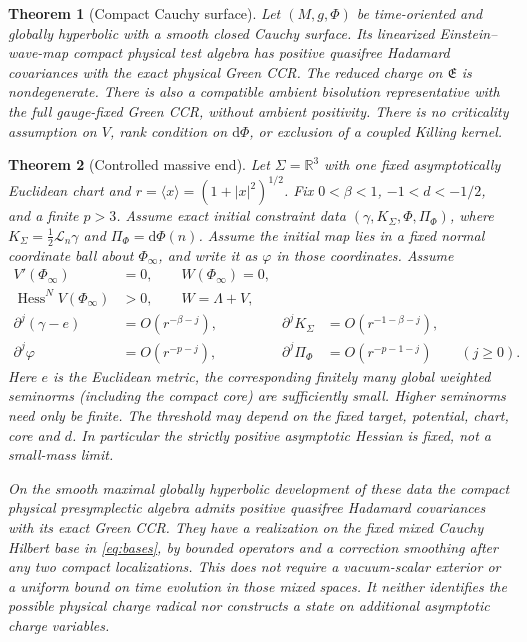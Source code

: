 \documentclass[11pt]{article}
\newtheorem{theorem}{Theorem}
\newcommand{\dd}{\mathrm d}
\newcommand{\Lie}{\mathcal L}
\begin{document}
\begin{theorem}[Compact Cauchy surface]\label{thm:compact}
Let \((M,g,\Phi)\) be time-oriented and globally hyperbolic with a smooth closed Cauchy surface. Its linearized Einstein--wave-map compact physical test algebra has positive quasifree Hadamard covariances with the exact physical Green CCR. The reduced charge on \(\mathfrak E\) is nondegenerate. There is also a compatible ambient bisolution representative with the full gauge-fixed Green CCR, without ambient positivity. There is no criticality assumption on \(V\), rank condition on \(\dd\Phi\), or exclusion of a coupled Killing kernel.
\end{theorem}

\begin{theorem}[Controlled massive end]\label{thm:af}
Let \(\Sigma=\mathbb R^3\) with one fixed asymptotically Euclidean chart and \(r=\langle x\rangle=(1+|x|^2)^{1/2}\). Fix \(0<\beta<1\), \(-1<d<-1/2\), and a finite \(p>3\). Assume exact initial constraint data \((\gamma,K_\Sigma,\Phi,\Pi_\Phi)\), where \(K_\Sigma=\tfrac12\Lie_n\gamma\) and \(\Pi_\Phi=\dd\Phi(n)\). Assume the initial map lies in a fixed normal coordinate ball about \(\Phi_\infty\), and write it as \(\varphi\) in those coordinates. Assume
\begin{align}
 V'(\Phi_\infty)&=0, \qquad W(\Phi_\infty)=0,\nonumber\\
 \operatorname{Hess}^N V(\Phi_\infty)&>0, \qquad W=\Lambda+V,\nonumber\\
 \partial^j(\gamma-e)&=O(r^{-\beta-j}),&
 \partial^j K_\Sigma&=O(r^{-1-\beta-j}),\nonumber\\
 \partial^j\varphi&=O(r^{-p-j}),&
 \partial^j\Pi_\Phi&=O(r^{-p-1-j}) \qquad(j\geq0).
 \label{eq:end}
\end{align}
Here \(e\) is the Euclidean metric, the corresponding finitely many global weighted seminorms (including the compact core) are sufficiently small. Higher seminorms need only be finite. The threshold may depend on the fixed target, potential, chart, core and \(d\). In particular the strictly positive asymptotic Hessian is fixed, not a small-mass limit.

On the smooth maximal globally hyperbolic development of these data the compact physical presymplectic algebra admits positive quasifree Hadamard covariances with its exact Green CCR. They have a realization on the fixed mixed Cauchy Hilbert base in \eqref{eq:bases}, by bounded operators and a correction smoothing after any two compact localizations. This does not require a vacuum-scalar exterior or a uniform bound on time evolution in those mixed spaces. It neither identifies the possible physical charge radical nor constructs a state on additional asymptotic charge variables.
\end{theorem}
\end{document}
